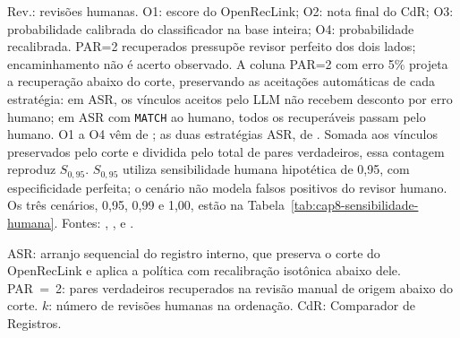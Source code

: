 \begin{table}[!htbp]
\begin{tabular}
\end{tabular}
\par\smallskip\parbox{\linewidth}{\footnotesize Rev.: revisões humanas. O1: escore do OpenRecLink; O2: nota final do CdR; O3: probabilidade calibrada do classificador na base inteira; O4: probabilidade recalibrada. PAR=2 recuperados pressupõe revisor perfeito dos dois lados; encaminhamento não é acerto observado. A coluna PAR=2 com erro 5\% projeta a recuperação abaixo do corte, preservando as aceitações automáticas de cada estratégia: em ASR, os vínculos aceitos pelo LLM não recebem desconto por erro humano; em ASR com \texttt{MATCH} ao humano, todos os recuperáveis passam pelo humano. O1 a O4 vêm de ; as duas estratégias ASR, de . Somada aos vínculos preservados pelo corte e dividida pelo total de pares verdadeiros, essa contagem reproduz $S_{0,95}$. $S_{0,95}$ utiliza sensibilidade humana hipotética de 0,95, com especificidade perfeita; o cenário não modela falsos positivos do revisor humano. Os três cenários, 0,95, 0,99 e 1,00, estão na Tabela~\ref{tab:cap8-sensibilidade-humana}. Fontes: , ,  e .}
\par\footnotesize ASR: arranjo sequencial do registro interno, que preserva o corte do OpenRecLink e aplica a política com recalibração isotônica abaixo dele. PAR~=~2: pares verdadeiros recuperados na revisão manual de origem abaixo do corte. $k$: número de revisões humanas na ordenação. CdR: Comparador de Registros.
\end{table}
